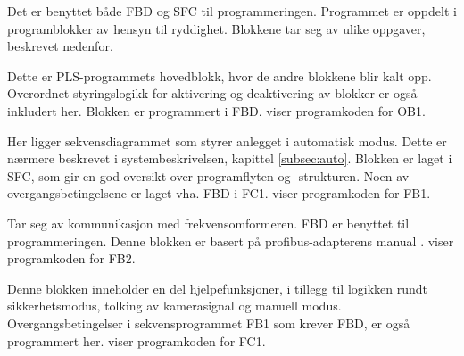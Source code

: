 \documentclass[Visionprosjekt.tex]{subfiles}
\begin{document}
Det er benyttet både FBD og SFC til programmeringen. Programmet er oppdelt i programblokker av hensyn til ryddighet. Blokkene tar seg av ulike oppgaver, beskrevet nedenfor. %


\begin{description}[style=multiline,leftmargin=13mm]

    \item[OB1] Dette er PLS-programmets hovedblokk, hvor de andre blokkene blir kalt opp. Overordnet styringslogikk for aktivering og deaktivering av blokker er også inkludert her. Blokken er programmert i FBD.  viser programkoden for OB1.


    \item[FB1] Her ligger sekvensdiagrammet som styrer anlegget i automatisk modus. Dette er nærmere beskrevet i systembeskrivelsen, kapittel \ref{subsec:auto}. Blokken er laget i SFC,  som gir en god oversikt over programflyten og -strukturen. Noen av overgangsbetingelsene er laget vha. FBD i FC1.  viser programkoden for FB1.



    \item[FB2] Tar seg av kommunikasjon med frekvensomformeren. FBD er benyttet til programmeringen. Denne blokken er basert på profibus-adapterens manual \cite{profibusadapter}.  viser programkoden for FB2.

    \item[FC1] Denne blokken inneholder en del hjelpefunksjoner, i tillegg til logikken rundt  sikkerhetsmodus, tolking av kamerasignal og manuell modus. Overgangsbetingelser i sekvensprogrammet FB1 som krever FBD, er også programmert her.  viser programkoden for FC1.

\end{description}
\end{document}
